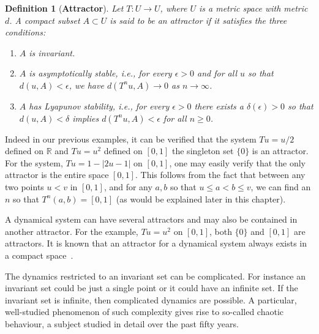 \documentclass[a4paper,12pt,twoside]{report}
\newtheorem{Definition}{Definition}[]
\begin{document}
\begin{Definition}
  [\bf Attractor]\label{Dfn_Attractor}\rm
  Let $T: U \to U$, where $U$  is a metric space with metric $d$. A compact subset $A \subset U$ is said to be an attractor if it satisfies the three conditions: 
  \vspace{-8mm}
  \begin{enumerate}
	\item $A$ is invariant. 
	\item $A$ is asymptotically stable, i.e., for every $\epsilon > 0$ and for all $u$ so that $d(u,A) < \epsilon$, we have $d(T^nu,A) \to 0$ as $n\to \infty$. 
	\item $A$ has Lyapunov stability, i.e., for every $\epsilon > 0$  there exists a $\delta(\epsilon) > 0$ so that $d(u,A) < \delta$ implies $d(T^nu,A) < \epsilon$ for all $n\ge 0$.  
\end{enumerate}
\end{Definition} 

Indeed in our previous examples, it can be verified that the system  $Tu=u/2$ defined on  $\mathbb{R}$ and $Tu=u^2$ defined on $[0,1]$  the singleton set $\{0\}$ is an attractor.  For the system,  $Tu=1-|2u-1|$ on $[0,1]$, one may easily verify that the only attractor is the entire space $[0,1]$. This follows from the fact that between any two points $u< v$ in $[0,1]$, and for any $a,b$ so that $u\le a < b \le v$, we can find an $n$ so that $T^n(a,b)=[0,1]$ (as would be explained later in this chapter). 

A dynamical system can have several attractors and may also be contained in another attractor. For the example, $Tu =u^2$ on $[0,1]$, both $\{0\}$ and $[0,1]$ are attractors. It is known that an attractor for a dynamical system always exists in a compact space~\cite{Milnor1985}.

The dynamics restricted to an invariant set can be complicated. For instance an invariant set could be just a single point or it could have an infinite set. If the invariant set is infinite, then complicated dynamics are possible. A particular, well-studied phenomenon of such complexity gives rise to so-called chaotic behaviour, a subject studied in detail over the past fifty years.

\end{document}
